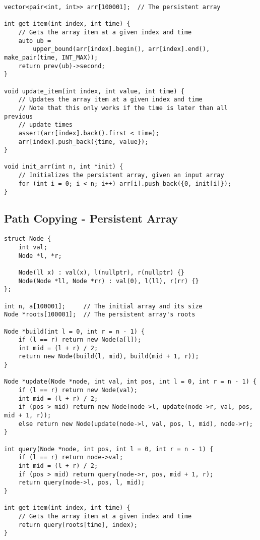 \documentclass[10pt]{article}
\begin{document}
\begin{multicols*}{2}
\begin{lstlisting}[style=compactcpp]
vector<pair<int, int>> arr[100001];  // The persistent array

int get_item(int index, int time) {
	// Gets the array item at a given index and time
	auto ub =
	    upper_bound(arr[index].begin(), arr[index].end(), make_pair(time, INT_MAX));
	return prev(ub)->second;
}

void update_item(int index, int value, int time) {
	// Updates the array item at a given index and time
	// Note that this only works if the time is later than all previous
	// update times
	assert(arr[index].back().first < time);
	arr[index].push_back({time, value});
}

void init_arr(int n, int *init) {
	// Initializes the persistent array, given an input array
	for (int i = 0; i < n; i++) arr[i].push_back({0, init[i]});
}
\end{lstlisting}


\subsection{Path Copying - Persistent Array}


\begin{lstlisting}[style=compactcpp]
    	struct Node {
	int val;
	Node *l, *r;

	Node(ll x) : val(x), l(nullptr), r(nullptr) {}
	Node(Node *ll, Node *rr) : val(0), l(ll), r(rr) {}
};

int n, a[100001];     // The initial array and its size
Node *roots[100001];  // The persistent array's roots

Node *build(int l = 0, int r = n - 1) {
	if (l == r) return new Node(a[l]);
	int mid = (l + r) / 2;
	return new Node(build(l, mid), build(mid + 1, r));
}

Node *update(Node *node, int val, int pos, int l = 0, int r = n - 1) {
	if (l == r) return new Node(val);
	int mid = (l + r) / 2;
	if (pos > mid) return new Node(node->l, update(node->r, val, pos, mid + 1, r));
	else return new Node(update(node->l, val, pos, l, mid), node->r);
}

int query(Node *node, int pos, int l = 0, int r = n - 1) {
	if (l == r) return node->val;
	int mid = (l + r) / 2;
	if (pos > mid) return query(node->r, pos, mid + 1, r);
	return query(node->l, pos, l, mid);
}

int get_item(int index, int time) {
	// Gets the array item at a given index and time
	return query(roots[time], index);
}


\end{lstlisting}
\end{multicols*}
\end{document}
